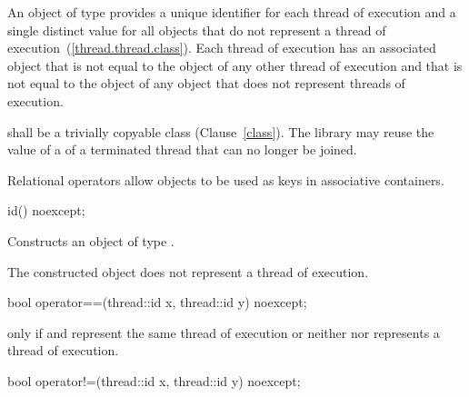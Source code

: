 \pnum An object of type  provides a unique identifier for
each thread of execution and a single distinct value for all 
objects that do not represent a thread of
execution~(\ref{thread.thread.class}). Each thread of execution has an
associated  object that is not equal to the
 object of any other thread of execution and that is not
equal to the  object of any  object that
does not represent threads of execution.

\pnum
{} shall be a trivially copyable class (Clause~\ref{class}).
The library may reuse the value of a  of a terminated thread that can no longer be joined.

\pnum
\enternote Relational operators allow  objects to be used as
keys in associative containers. \exitnote

%
\begin{itemdecl}
id() noexcept;
\end{itemdecl}

\begin{itemdescr}
\pnum\effects Constructs an object of type .

\pnum\postconditions The constructed object does not represent a thread of execution.
\end{itemdescr}

%
%
\begin{itemdecl}
bool operator==(thread::id x, thread::id y) noexcept;
\end{itemdecl}

\begin{itemdescr}
\pnum\returns {} only if  and  represent the same
thread of execution or neither  nor  represents a thread of
execution.
\end{itemdescr}

%
%
\begin{itemdecl}
bool operator!=(thread::id x, thread::id y) noexcept;
\end{itemdecl}

\begin{itemdescr}
\pnum\returns {}
\end{itemdescr}

